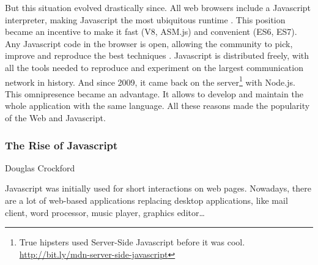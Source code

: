 But this situation evolved drastically since.
All web browsers include a Java\-script interpreter, making Java\-script the most ubiquitous runtime \cite{Flanagan2006}.
This position became an incentive to make it fast (V8, ASM.js) and convenient (ES6, ES7).
Any Java\-script code in the browser is open, allowing the community to pick, improve and reproduce the best techniques .
Java\-script is distributed freely, with all the tools needed to reproduce and experiment on the largest communication network in history.
And since 2009, it came back on the server\footnote{True hipsters used Server-Side Java\-script before it was cool. \url{http://bit.ly/mdn-server-side-javascript}} with Node.js.
This omnipresence became an advantage.
It allows to develop and maintain the whole application with the same language.
All these reasons made the popularity of the Web and Java\-script.


\subsubsection{The Rise of Java\-script}

%
{Douglas Crockford}

Java\-script was initially used for short interactions on web pages.
Nowadays, there are a lot of web-based applications replacing desktop applications, like mail client, word processor, music player, graphics editor\ldots


